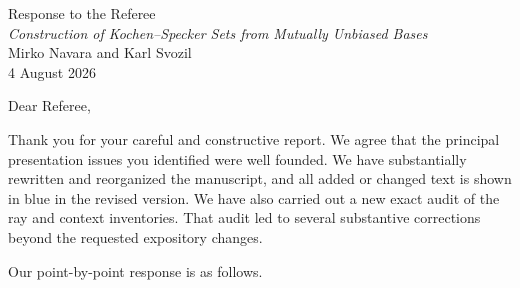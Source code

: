 \documentclass[11pt]{article}
\newcommand{\manuscript}{\textit{Construction of Kochen--Specker Sets from Mutually Unbiased Bases}}
\begin{document}
\begin{center}
{\Large Response to the Referee}\\[0.5em]
\manuscript\\[0.25em]
Mirko Navara and Karl Svozil\\[0.25em]
4 August 2026
\end{center}

Dear Referee,

Thank you for your careful and constructive report.  We agree that the principal presentation issues you identified were well founded.  We have substantially rewritten and reorganized the manuscript, and all added or changed text is shown in blue in the revised version.  We have also carried out a new exact audit of the ray and context inventories.  That audit led to several substantive corrections beyond the requested expository changes.

Our point-by-point response is as follows.
\end{document}
